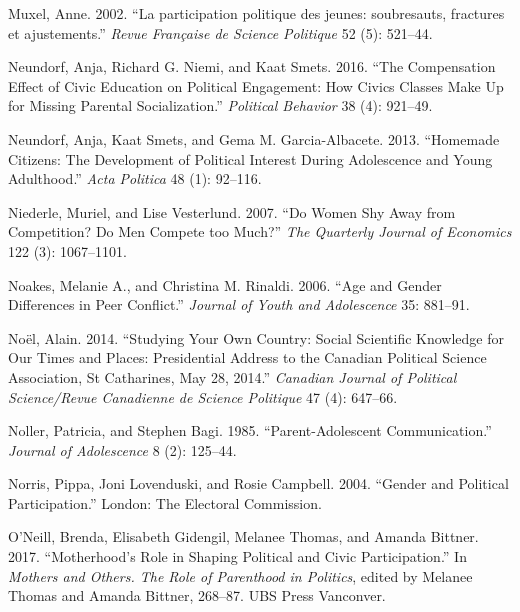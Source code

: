 \documentclass[
  letterpaper,
  DIV=11,
  numbers=noendperiod]{scrreprt}
\newlength{\cslhangindent}
\newlength{\cslentryspacingunit} %
\newenvironment{CSLReferences}[2] %
 {%
  \setlength{\parindent}{0pt}
  \ifodd #1
  \let\oldpar\par
  \def\par{\hangindent=\cslhangindent\oldpar}
  \fi
  \setlength{\parskip}{#2\cslentryspacingunit}
 }%
 {}
\begin{document}
\begin{CSLReferences}{1}{0}
\leavevmode{}%
Muxel, Anne. 2002. {``{La participation politique des jeunes:
soubresauts, fractures et ajustements}.''} \emph{Revue Fran{ç}aise de
Science Politique} 52 (5): 521--44.

\leavevmode{}%
Neundorf, Anja, Richard G. Niemi, and Kaat Smets. 2016. {``{The
Compensation Effect of Civic Education on Political Engagement: How
Civics Classes Make Up for Missing Parental Socialization}.''}
\emph{Political Behavior} 38 (4): 921--49.

\leavevmode{}%
Neundorf, Anja, Kaat Smets, and Gema M. Garcia-Albacete. 2013.
{``{Homemade Citizens: The Development of Political Interest During
Adolescence and Young Adulthood}.''} \emph{Acta Politica} 48 (1):
92--116.

\leavevmode{}%
Niederle, Muriel, and Lise Vesterlund. 2007. {``{Do Women Shy Away from
Competition? Do Men Compete too Much?}''} \emph{The Quarterly Journal of
Economics} 122 (3): 1067--1101.

\leavevmode{}%
Noakes, Melanie A., and Christina M. Rinaldi. 2006. {``{Age and Gender
Differences in Peer Conflict}.''} \emph{Journal of Youth and
Adolescence} 35: 881--91.

\leavevmode{}%
Noël, Alain. 2014. {``{Studying Your Own Country: Social Scientific
Knowledge for Our Times and Places: Presidential Address to the Canadian
Political Science Association, St Catharines, May 28, 2014}.''}
\emph{Canadian Journal of Political Science/Revue Canadienne de Science
Politique} 47 (4): 647--66.

\leavevmode{}%
Noller, Patricia, and Stephen Bagi. 1985. {``{Parent-Adolescent
Communication}.''} \emph{Journal of Adolescence} 8 (2): 125--44.

\leavevmode{}%
Norris, Pippa, Joni Lovenduski, and Rosie Campbell. 2004. {``{Gender and
Political Participation}.''} London: The Electoral Commission.

\leavevmode{}%
O'Neill, Brenda, Elisabeth Gidengil, Melanee Thomas, and Amanda Bittner.
2017. {``{Motherhood's Role in Shaping Political and Civic
Participation}.''} In \emph{{Mothers and Others. The Role of Parenthood
in Politics}}, edited by Melanee Thomas and Amanda Bittner, 268--87. UBS
Press Vanconver.


\end{CSLReferences}
\end{document}
